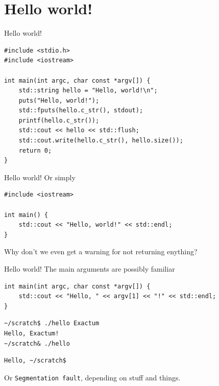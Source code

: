 \documentclass[11pt, aspectratio=169, table]{beamer}
\begin{document}
\section{Hello world!}
\begin{frame}[fragile]{Hello world!}
\begin{verbatim}
#include <stdio.h>
#include <iostream>

int main(int argc, char const *argv[]) {
    std::string hello = "Hello, world!\n";
    puts("Hello, world!");
    std::fputs(hello.c_str(), stdout);
    printf(hello.c_str());
    std::cout << hello << std::flush;
    std::cout.write(hello.c_str(), hello.size());
    return 0;
}
\end{verbatim}
\end{frame}

\begin{frame}[fragile]{Hello world!}
Or simply

\begin{verbatim}
#include <iostream>

int main() {
    std::cout << "Hello, world!" << std::endl;
}
\end{verbatim}

Why don't we even get a warning for not returning enything?
\end{frame}

\begin{frame}[fragile]{Hello world!}
The main arguments are possibly familiar

\begin{verbatim}
int main(int argc, char const *argv[]) {
	std::cout << "Hello, " << argv[1] << "!" << std::endl;
}
\end{verbatim}

\begin{verbatim}
~/scratch$ ./hello Exactum
Hello, Exactum!
~/scratch& ./hello
\end{verbatim}
\pause\vspace{-1.2cm}
\begin{verbatim}
Hello, ~/scratch$
\end{verbatim}

Or \texttt{Segmentation fault}, depending on stuff and things.
\end{frame}
\end{document}
